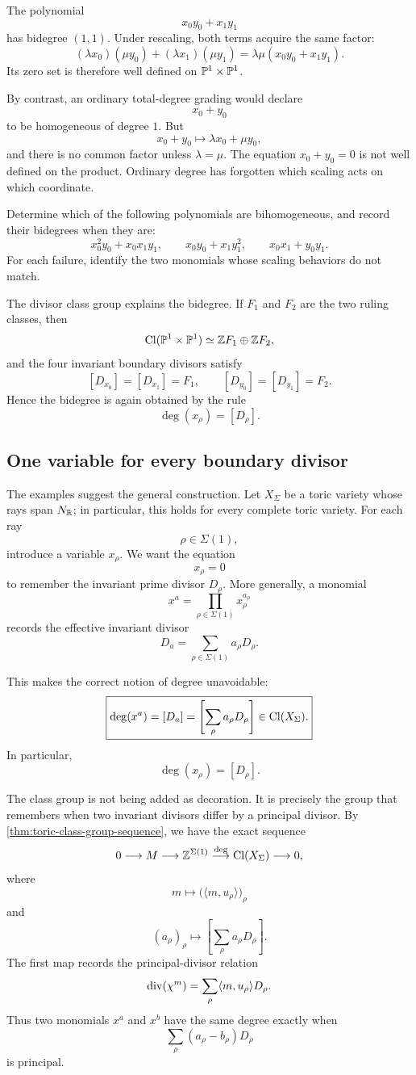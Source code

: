 The polynomial
\[
x_0y_0+x_1y_1
\]
has bidegree \((1,1)\). Under rescaling, both terms acquire the same
factor:
\[
(\lambda x_0)(\mu y_0)+(\lambda x_1)(\mu y_1)
=
\lambda\mu(x_0y_0+x_1y_1).
\]
Its zero set is therefore well defined on \(\mathbb{P}^1\times\mathbb{P}^1\).

By contrast, an ordinary total-degree grading would declare
\[
x_0+y_0
\]
to be homogeneous of degree \(1\). But
\[
x_0+y_0
\longmapsto
\lambda x_0+\mu y_0,
\]
and there is no common factor unless \(\lambda=\mu\). The equation
\(x_0+y_0=0\) is not well defined on the product. Ordinary degree has
forgotten which scaling acts on which coordinate.

\begin{pauseandthink}
Determine which of the following polynomials are bihomogeneous, and
record their bidegrees when they are:
\[
x_0^2y_0+x_0x_1y_1,
\qquad
x_0y_0+x_1y_1^2,
\qquad
x_0x_1+y_0y_1.
\]
For each failure, identify the two monomials whose scaling behaviors
do not match.
\end{pauseandthink}

The divisor class group explains the bidegree. If \(F_1\) and \(F_2\)
are the two ruling classes, then
\[
\operatorname{Cl}(\mathbb{P}^1\times\mathbb{P}^1)
\simeq
\mathbb{Z} F_1\oplus\mathbb{Z} F_2,
\]
and the four invariant boundary divisors satisfy
\[
[D_{x_0}]=[D_{x_1}]=F_1,
\qquad
[D_{y_0}]=[D_{y_1}]=F_2.
\]
Hence the bidegree is again obtained by the rule
\[
\deg(x_\rho)=[D_\rho].
\]

\subsection{One variable for every boundary divisor}

The examples suggest the general construction. Let \(X_\Sigma\) be a
toric variety whose rays span \(N_{\mathbb{R}}\); in particular, this holds for
every complete toric variety. For each ray
\[
\rho\in\Sigma(1),
\]
introduce a variable \(x_\rho\). We want the equation
\[
x_\rho=0
\]
to remember the invariant prime divisor \(D_\rho\). More generally, a
monomial
\[
x^a=\prod_{\rho\in\Sigma(1)}x_\rho^{a_\rho}
\]
records the effective invariant divisor
\[
D_a=\sum_{\rho\in\Sigma(1)}a_\rho D_\rho.
\]

This makes the correct notion of degree unavoidable:
\[
\boxed{
\deg(x^a)
=
[D_a]
=
\left[\sum_{\rho}a_\rho D_\rho\right]
\in\operatorname{Cl}(X_\Sigma).
}
\]
In particular,
\[
\boxed{
\deg(x_\rho)=[D_\rho].
}
\]

The class group is not being added as decoration. It is precisely the
group that remembers when two invariant divisors differ by a principal
divisor. By \cref{thm:toric-class-group-sequence}, we have the exact
sequence
\[
0\longrightarrow M
\longrightarrow \mathbb{Z}^{\Sigma(1)}
\stackrel{\deg}{\longrightarrow}\operatorname{Cl}(X_\Sigma)
\longrightarrow0,
\]
where
\[
m\longmapsto
\bigl(\langle m,u_\rho\rangle\bigr)_\rho
\]
and
\[
(a_\rho)_\rho
\longmapsto
\left[\sum_\rho a_\rho D_\rho\right].
\]
The first map records the principal-divisor relation
\[
\operatorname{div}(\chi^{m})
=
\sum_\rho\langle m,u_\rho\rangle D_\rho.
\]
Thus two monomials \(x^a\) and \(x^b\) have the same degree exactly
when
\[
\sum_\rho(a_\rho-b_\rho)D_\rho
\]
is principal.

